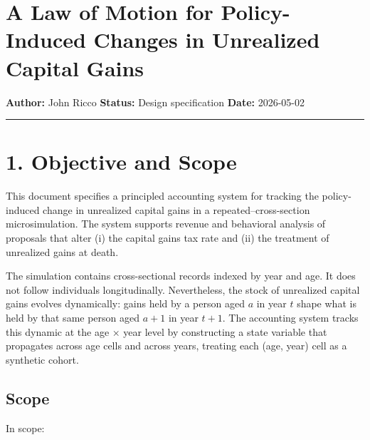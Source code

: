 \documentclass[11pt]{article}
\begin{document}
\section*{A Law of Motion for Policy-Induced Changes in Unrealized Capital Gains}

\textbf{Author:} John Ricco \textbf{Status:} Design specification \textbf{Date:} 2026-05-02

\par\medskip\hrule\medskip

\section*{1. Objective and Scope}

This document specifies a principled accounting system for tracking the policy-induced change in unrealized capital gains in a repeated–cross-section microsimulation. The system supports revenue and behavioral analysis of proposals that alter (i) the capital gains tax rate and (ii) the treatment of unrealized gains at death.

The simulation contains cross-sectional records indexed by year and age. It does not follow individuals longitudinally. Nevertheless, the stock of unrealized capital gains evolves dynamically: gains held by a person aged $a$ in year $t$ shape what is held by that same person aged $a+1$ in year $t+1$. The accounting system tracks this dynamic at the age × year level by constructing a state variable that propagates across age cells and across years, treating each (age, year) cell as a synthetic cohort.

\subsection*{Scope}

In scope:
\end{document}
